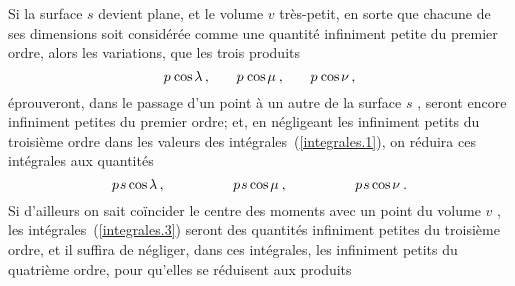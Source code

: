 \documentclass[11pt, twoside, leqno]{article}
\renewcommand{\eqref}[1]{(\ref{#1})}
\newcommand\cosine{\operatorname{cos} \hspace{-0.1ex}}
\begin{document}
Si la surface \;$s$\; devient plane, et le volume \;$v$\; très-petit, en sorte que chacune de ses dimensions soit considérée comme une quantité infiniment petite du premier ordre, alors les variations, que les trois produits
\begin{equation} %
p \hspace{.16ex} \cosine \lambda \hspace{.4ex} \text{,} \hspace{2em}
p \hspace{.18ex} \cosine \mu \hspace{.5ex} \text{,} \hspace{2em}
p \hspace{.16ex} \cosine \nu \hspace{.4ex} \text{,}
\end{equation}
éprouveront, dans le passage d'un point à un autre de la surface \;$s$\hspace{.8ex} ,\hspace{.5ex} seront encore infiniment petites du premier ordre; et, en négligeant les infiniment petits du troisième ordre dans les valeurs des intégrales~\eqref{integrales.1}, on réduira ces intégrales aux quantités
\begin{equation}\label{expression.6}
p \hspace{.15ex} s \cosine \lambda
\hspace{.4ex} \text{,} \hspace{5em}
p \hspace{.15ex} s \cosine \mu
\hspace{.5ex} \text{,} \hspace{5em}
p \hspace{.15ex} s \cosine \nu
\hspace{.5ex} \text{.}
\end{equation}
Si d'ailleurs on sait coïncider le centre des moments avec un point du volume \;$v$\hspace{.8ex} , \hspace{.5ex} les intégrales~\eqref{integrales.3} seront des quantités infiniment petites du troisième ordre, et il suffira de négliger, dans ces intégrales, les infiniment petits du quatrième ordre, pour qu'elles se réduisent aux produits
\end{document}

